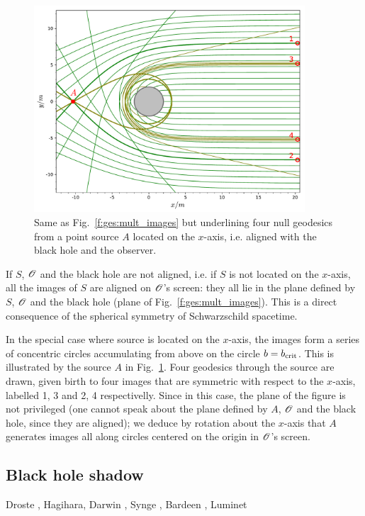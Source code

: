 \begin{figure}
\centerline{\includegraphics[width=0.9\textwidth]{ges_images_aligned.pdf}}
\caption[]{\label{f:ges:images_aligned} \footnotesize
Same as Fig.~\ref{f:ges:mult_images} but underlining four null geodesics
from a point source $A$ located on the $x$-axis, i.e.
aligned with the black hole and the observer.}
\end{figure}


If $S$, $\mathscr{O}$ and the black hole are not aligned, i.e. if $S$ is not located
on the $x$-axis, all the images of $S$ are aligned on $\mathscr{O}$'s screen: they
all lie in the plane defined by $S$, $\mathscr{O}$ and the black hole (plane of
Fig.~\ref{f:ges:mult_images}). This is a direct consequence of the spherical
symmetry of Schwarzschild spacetime.

In the special case where source is located on the $x$-axis, the images form
a series of concentric circles accumulating from above on the circle
$b = b_{\rm crit}$. This is illustrated by the source $A$ in
Fig.~\ref{f:ges:images_aligned}. Four geodesics through the source are drawn,
given birth to four images that
are symmetric with respect to the $x$-axis, labelled 1, 3 and 2, 4 respectivelly.
Since in this case, the plane of the figure is not privileged (one cannot speak
about the plane defined by $A$, $\mathscr{O}$ and the black hole, since they are aligned);
we deduce by rotation about the $x$-axis that $A$ generates images all along
circles centered on the origin in $\mathscr{O}$'s screen.


\subsection{Black hole shadow}


\begin{hist}
Droste \cite{Drost1917}, Hagihara,  Darwin \cite{Darwi59}, Synge \cite{Synge66}, Bardeen \cite{Barde73}, Luminet \cite{Lumin79,Lumin19}
\end{hist}














